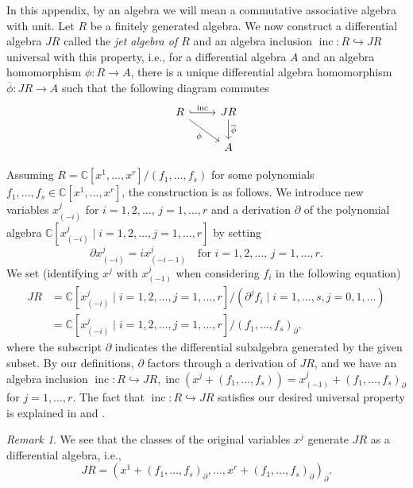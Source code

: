 \documentclass[a4paper, 12pt, reqno]{amsart}
\theoremstyle{remark}
\newtheorem{remark}[theorem]{Remark}
\DeclareMathOperator{\inc}{inc}
\begin{document}
In this appendix, by an algebra we will mean a commutative associative algebra with unit.
Let $R$ be a finitely generated algebra.
We now construct a differential algebra $JR$ called the \emph{jet algebra of $R$} and an algebra inclusion $\inc: R \hookrightarrow JR$ universal with this property, i.e., for a differential algebra $A$ and an algebra homomorphism $\phi: R \to A$, there is a unique differential algebra homomorphism $\overline{\phi}: JR \to A$ such that the following diagram commutes
\begin{equation*}
  \begin{tikzcd}
    R \arrow[r, "\inc", hook] \arrow[rd, "\phi"'] & JR \arrow[d, "\overline{\phi}"] \\
    & A
  \end{tikzcd}
\end{equation*}

Assuming $R = \mathbb{C}[x^1, \dots, x^r]/(f_1, \dots, f_s)$ for some polynomials $f_1, \dots, f_s \in \mathbb{C}[x^1, \dots, x^r]$, the construction is as follows.
We introduce new variables $x^j_{(-i)}$ for $i = 1, 2, \dots$, $j = 1, \dots, r$ and a derivation $\partial$ of the polynomial algebra $\mathbb{C}[x^j_{(-i)} \mid i = 1, 2, \dots, j = 1, \dots, r]$ by setting
\begin{equation*}
  \partial x^j_{(-i)} = ix^j_{(-i - 1)} \quad \text{for $i = 1, 2, \dots$, $j = 1, \dots, r$}.
\end{equation*}
We set (identifying $x^j$ with $x^j_{(-1)}$ when considering $f_i$ in the following equation)
\begin{align*}
  JR &= \mathbb{C}[x^j_{(-i)} \mid i = 1, 2, \dots, j = 1, \dots, r]/(\partial^jf_i \mid i = 1, \dots, s, j = 0, 1, \dots) \\
     &= \mathbb{C}[x^j_{(-i)} \mid i = 1, 2, \dots, j = 1, \dots, r]/(f_1, \dots, f_s)_{\partial},
\end{align*}
where the subscript $\partial$ indicates the differential subalgebra generated by the given subset.
By our definitions, $\partial$ factors through a derivation of $JR$, and we have an algebra inclusion $\inc: R \hookrightarrow JR, \inc(x^j + (f_1, \dots, f_s)) = x^j_{(-1)} + (f_1, \dots, f_s)_{\partial}$ for $j = 1, \dots, r$.
The fact that $\inc: R \hookrightarrow JR$ satisfies our desired universal property is explained in \cite[\S2.3]{arakawa_remark_2012} and \cite{ein_jet_2008}.

\begin{remark}
  \label{rmk:54}
  We see that the classes of the original variables $x^j$ generate $JR$ as a differential algebra, i.e.,
  \begin{equation*}
    JR = (x^1 + (f_1, \dots, f_s)_{\partial}, \dots, x^r + (f_1, \dots, f_s)_{\partial})_{\partial}.
  \end{equation*}
\end{remark}
\end{document}
